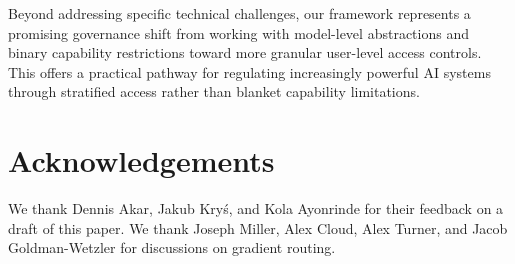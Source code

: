 \documentclass{article}
\theoremstyle{plain}
\theoremstyle{definition}
\theoremstyle{remark}
\begin{document}
Beyond addressing specific technical challenges, our framework
represents a promising governance shift from working with model-level
abstractions and binary capability restrictions toward more granular
user-level access controls. This offers a practical pathway for
regulating increasingly powerful AI systems through stratified access
rather than blanket capability limitations.

\section{Acknowledgements}

We thank Dennis Akar, Jakub Kryś, and Kola Ayonrinde for their feedback on a draft of this paper. We thank Joseph Miller, Alex Cloud, Alex Turner, and Jacob Goldman-Wetzler for discussions on gradient routing.




\newpage
\appendix
\onecolumn
\end{document}
